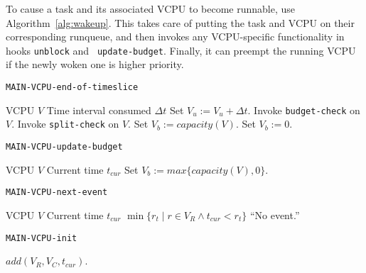 \documentclass[twocolumn,10pt]{article}
\begin{document}
To cause a task and its associated VCPU to become runnable, use
Algorithm~\ref{alg:wakeup}.  This takes care of putting the task and
VCPU on their corresponding runqueue, and then invokes any
VCPU-specific functionality in hooks {\tt unblock} and {\tt
  update-budget}.  Finally, it can preempt the running VCPU if the
newly woken one is higher priority.

\begin{algorithm*}
  \caption{\tt MAIN-VCPU-end-of-timeslice}\label{alg:vcpu_eot}
  \begin{algorithmic}[1]
    \REQUIRE VCPU $V$
    \REQUIRE Time interval consumed $\Delta t$
    \STATE Set $V_u:=V_u+\Delta t$.
    \STATE Invoke {\tt budget-check} on $V$.
    \STATE Invoke {\tt split-check} on $V$.
    \ENDIF
    \STATE Set $V_b:=capacity(V)$.
    \ELSE
    \STATE Set $V_b:=0$.
    \ENDIF
  \end{algorithmic}
\end{algorithm*}

\begin{algorithm}
  \caption{\tt MAIN-VCPU-update-budget}\label{alg:vcpu_upbudg}
  \begin{algorithmic}[1]
    \REQUIRE VCPU $V$
    \REQUIRE Current time $t_{cur}$
    \STATE Set $V_b:=max\{capacity(V), 0\}$.
  \end{algorithmic}
\end{algorithm}

\begin{algorithm}
  \caption{\tt MAIN-VCPU-next-event}\label{alg:vcpu_nextevent}
  \begin{algorithmic}[1]
    \REQUIRE VCPU $V$
    \REQUIRE Current time $t_{cur}$
    \RETURN $\min\{r_t \mid r\in V_R\wedge t_{cur}<r_t\}$ \OR ``No event.''
  \end{algorithmic}
\end{algorithm}

\begin{algorithm}
  \caption{\tt MAIN-VCPU-init}
  \begin{algorithmic}[1]
    \STATE $add(V_R,V_C,t_{cur})$.
  \end{algorithmic}
\end{algorithm}
\end{document}
